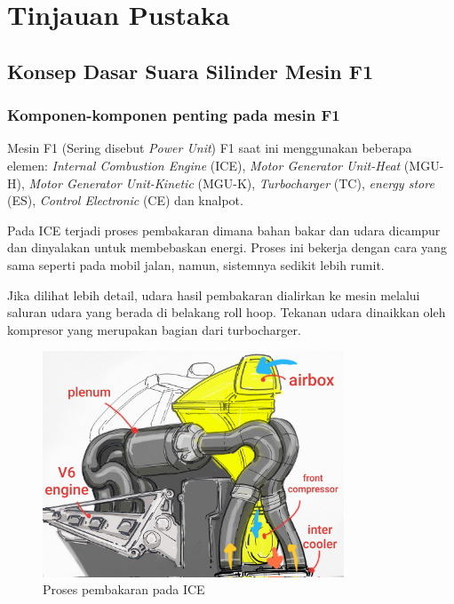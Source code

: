 \section{Tinjauan Pustaka}
\subsection{Konsep Dasar Suara Silinder Mesin F1}
\subsubsection{Komponen-komponen penting pada mesin F1}

Mesin F1 (Sering disebut \textit{Power Unit}) F1 saat ini menggunakan beberapa elemen: \textit{Internal Combustion Engine} (ICE), \textit{Motor Generator Unit-Heat} (MGU-H), \textit{Motor Generator Unit-Kinetic} (MGU-K), \textit{Turbocharger} (TC), \textit{energy store} (ES), \textit{Control Electronic} (CE) dan knalpot. \newline

Pada ICE terjadi proses pembakaran dimana bahan bakar dan udara dicampur dan dinyalakan untuk membebaskan energi. Proses ini bekerja dengan cara yang sama seperti pada mobil jalan, namun, sistemnya sedikit lebih rumit. \newline

Jika dilihat lebih detail, udara hasil pembakaran dialirkan ke mesin melalui saluran udara yang berada di belakang roll hoop. Tekanan udara dinaikkan oleh kompresor yang merupakan bagian dari turbocharger. \newline

\begin{figure}[htbp]
    \centering
    \includegraphics[width=0.8\textwidth]{images/f1-engine.jpg}
    \caption{Proses pembakaran pada ICE}
    \label{fig:Proses pembakaran pada ICE}
\end{figure}


